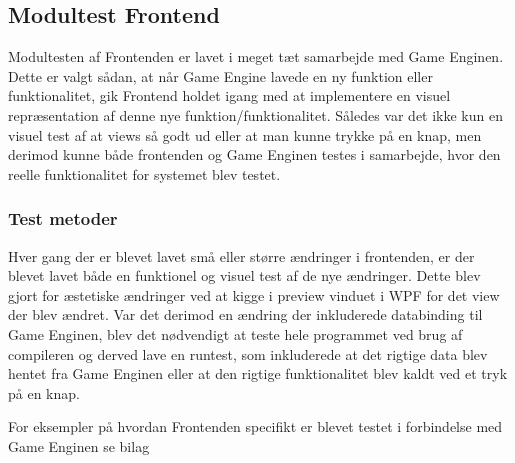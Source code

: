 \subsection{Modultest Frontend}
Modultesten af Frontenden er lavet i meget tæt samarbejde med Game Enginen. Dette er valgt sådan, at når Game Engine lavede en ny funktion eller funktionalitet, gik Frontend holdet igang med at implementere en visuel repræsentation af denne nye funktion/funktionalitet. Således var det ikke kun en visuel test af at views så godt ud eller at man kunne trykke på en knap, men derimod kunne både frontenden og Game Enginen testes i samarbejde, hvor den reelle funktionalitet for systemet blev testet.

\subsubsection{Test metoder}
Hver gang der er blevet lavet små eller større ændringer i frontenden, er der blevet lavet både en funktionel og visuel test af de nye ændringer. Dette blev gjort for æstetiske ændringer ved at kigge i preview vinduet i WPF for det view der blev ændret. Var det derimod en ændring der inkluderede databinding til Game Enginen, blev det nødvendigt at teste hele programmet ved brug af compileren og derved lave en runtest, som inkluderede at det rigtige data blev hentet fra Game Enginen eller at den rigtige funktionalitet blev kaldt ved et tryk på en knap.

\noindent For eksempler på hvordan Frontenden specifikt er blevet testet i forbindelse med Game Enginen se bilag \parencite[][Section 10.1]{TekniskBilag}
